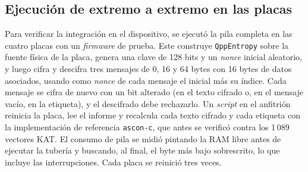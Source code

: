 \subsection{Ejecución de extremo a extremo en las placas}
\label{sec:res_e2e}

Para verificar la integración en el dispositivo, se ejecutó la pila completa en las cuatro placas con un \textit{firmware} de prueba. Este construye \texttt{QppEntropy} sobre la fuente física de la placa, genera una clave de 128 bits y un \textit{nonce} inicial aleatorio, y luego cifra y descifra tres mensajes de 0, 16 y 64 bytes con 16 bytes de datos asociados, usando como \textit{nonce} de cada mensaje el inicial más su índice. Cada mensaje se cifra de nuevo con un bit alterado (en el texto cifrado o, en el mensaje vacío, en la etiqueta), y el descifrado debe rechazarlo. Un \textit{script} en el anfitrión reinicia la placa, lee el informe y recalcula cada texto cifrado y cada etiqueta con la implementación de referencia \texttt{ascon-c}, que antes se verificó contra los 1\,089 vectores KAT. El consumo de pila se midió pintando la RAM libre antes de ejecutar la tubería y buscando, al final, el byte más bajo sobrescrito, lo que incluye las interrupciones. Cada placa se reinició tres veces.

